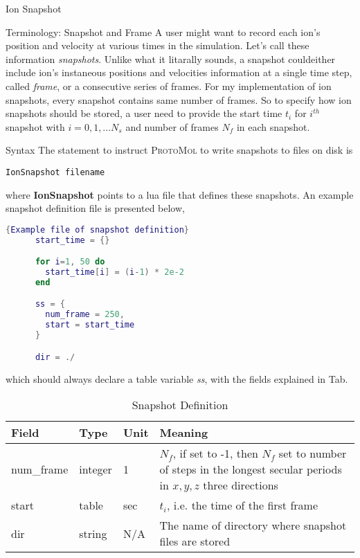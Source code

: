 \begin{subsection} {Ion Snapshot}
  \begin{subsubsection} { Terminology: Snapshot and Frame }
    A user might want to record each ion's position and velocity at various times in the simulation. Let's call these information \emph{snapshots}. Unlike what it litarally sounds, a snapshot couldeither include ion's instaneous positions and velocities information at a single time step, called \emph{frame}, or a consecutive series of frames.
    For my implementation of ion snapshots, every snapshot contains same number of frames. So to specify how ion snapshots should be stored, a user need to provide the start time $t_i$ for $i^{th}$ snapshot with $i=0, 1, ... N_s$ and number of frames $N_{f}$ in each snapshot.
  \end{subsubsection}


  \begin{subsubsection} {Syntax}
    The statement to instruct \textsc{ProtoMol} to write snapshots to files on disk is
    \begin{lstlisting}[emph=IonSnapshot]
      IonSnapshot filename\end{lstlisting}
    where \textbf{IonSnapshot} points to a lua file that defines these snapshots. An example snapshot definition file is presented below,
    \begin{lstlisting}[language=LUA]{Example file of snapshot definition}
      start_time = {}

      for i=1, 50 do
        start_time[i] = (i-1) * 2e-2
      end

      ss = {
        num_frame = 250, 
        start = start_time 
      }

      dir = ./\end{lstlisting}
    which should always declare a table variable \emph{ss}, with the fields explained in Tab. 
    \begin{table}[h!]
      \centering
      \begin{tabular}{l  l  l  p{7cm} } \toprule
        Field & Type &  Unit & Meaning\\ \midrule
        num\_frame & integer & 1 & $N_f$, if set to -1, then $N_f$ set to number of steps  in the longest secular periods in $x,y,z$ three directions \\ 
        start & table & sec & $t_i$, i.e. the time of the first frame \\
        dir & string & N/A & The name of directory where snapshot files are stored\\
        \bottomrule
      \end{tabular}
      \caption{Snapshot Definition}
      \label{tab:ion_snapshot_def}
    \end{table}
  \end{subsubsection}


\end{subsection}
